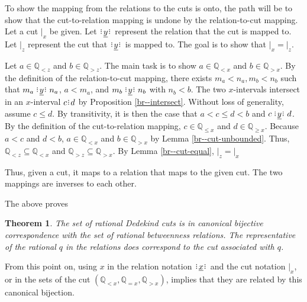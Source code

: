 \documentclass[12pt]{article}
\newtheorem{theorem}{Theorem}
\newcommand{\qcut}[2][x]{\ensuremath{\mathbb{Q}_{#2 #1}}}
\newcommand{\qlt}[1][x]{\qcut[#1]{<}}
\newcommand{\qeq}[1][x]{\qcut[#1]{=}}
\newcommand{\qgt}[1][x]{\qcut[#1]{>}}
\newcommand{\qgeq}[1][x]{\qcut[#1]{\geq}}
\newcommand{\qleq}[1][x]{\qcut[#1]{\leq}}
\newcommand{\cut}[1][x]{{\vert}_{#1} }
\newcommand{\yrel}{\xrel[y]}
\begin{document}
To show the mapping from the relations to the cuts is onto, the path will be to show that the cut-to-relation mapping is undone by the relation-to-cut mapping. Let a cut $\cut$ be given. Let $\yrel$ represent the relation that the cut is mapped to. Let $\cut[z]$ represent the cut that $\yrel$ is mapped to. The goal is to show that $\cut = \cut[z]$.  

Let $a \in \qlt[z]$ and $b \in \qgt[z]$. The main task is to show $a \in \qlt$ and $b \in \qgt$. By the definition of the relation-to-cut mapping, there exists $m_a < n_a, m_b < n_b$ such that $m_a \xrel[y] n_a$, $a < m_a$, and $m_b \xrel[y] n_b$ with $n_b < b$. The two $x$-intervals intersect in an $x$-interval $c\rint d$ by  Proposition \ref{br--intersect}. Without loss of generality, assume $c \leq d$. By transitivity, it is then the case that $a < c \leq d < b$ and $c \yrel d$. By the definition of the cut-to-relation mapping, $c \in \qleq$ and $d \in \qgeq$. Because $a < c$ and $ d < b$, $a \in \qlt$ and $b \in \qgt$ by Lemma \ref{br--cut-unbounded}. Thus, $\qlt[z] \subseteq \qlt$ and $\qgt[z] \subseteq \qgt$. By Lemma \ref{br--cut-equal}, $\cut[z] = \cut$


Thus, given a cut, it maps to a relation that maps to the given cut. The two mappings are inverses to each other.

The above proves 
\begin{theorem}
    The set of rational Dedekind cuts is in canonical bijective correspondence with the set of rational betweenness relations. The representative of the rational $q$ in the relations does correspond to the cut associated with $q$.
\end{theorem}

From this point on, using $x$ in the relation notation $\xrel$ and the cut notation $\cut$, or in the sets of the cut $(\qlt, \qeq, \qgt)$, implies that they are related by this canonical bijection. 
\end{document}
